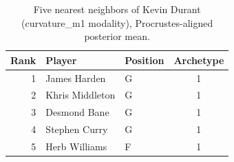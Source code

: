 \begin{table}[htbp]
  \centering\small
  \begin{tabular}{rllc}
    \toprule
    Rank & Player & Position & Archetype \\
    \midrule
    1 & James Harden & G & 1 \\
    2 & Khris Middleton & G & 1 \\
    3 & Desmond Bane & G & 1 \\
    4 & Stephen Curry & G & 1 \\
    5 & Herb Williams & F & 1 \\
    \bottomrule
  \end{tabular}
  \caption{Five nearest neighbors of Kevin Durant (curvature_m1 modality), Procrustes-aligned posterior mean.}
  \label{tab:Kevin_Durant_neighbors_curvature_m1}
\end{table}

